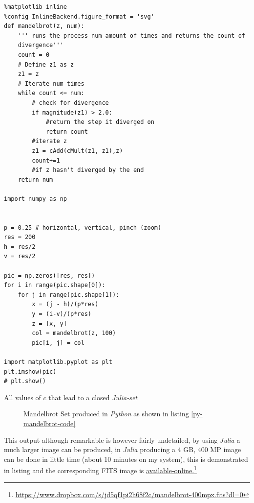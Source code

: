 \documentclass[a4paper,11pt,twoside]{article}
\begin{document}
\begin{listing}[htbp]
\begin{verbatim}
%matplotlib inline
%config InlineBackend.figure_format = 'svg'
def mandelbrot(z, num):
    ''' runs the process num amount of times and returns the count of
    divergence'''
    count = 0
    # Define z1 as z
    z1 = z
    # Iterate num times
    while count <= num:
        # check for divergence
        if magnitude(z1) > 2.0:
            #return the step it diverged on
            return count
        #iterate z
        z1 = cAdd(cMult(z1, z1),z)
        count+=1
        #if z hasn't diverged by the end
    return num

import numpy as np


p = 0.25 # horizontal, vertical, pinch (zoom)
res = 200
h = res/2
v = res/2

pic = np.zeros([res, res])
for i in range(pic.shape[0]):
    for j in range(pic.shape[1]):
        x = (j - h)/(p*res)
        y = (i-v)/(p*res)
        z = [x, y]
        col = mandelbrot(z, 100)
        pic[i, j] = col

import matplotlib.pyplot as plt
plt.imshow(pic)
# plt.show()
\end{verbatim}
\caption{\label{py-mandelbrot-code}All values of \(c\) that lead to a closed \emph{Julia-set}}
\end{listing}

\begin{figure}[htbp]
\centering

\caption{\label{mandelbrot-py-pic}Mandelbrot Set produced in \emph{Python} as shown in listing \ref{py-mandelbrot-code}}
\end{figure}

This output although remarkable is however fairly undetailed, by using \emph{Julia} a much
larger image can be produced, in \emph{Julia} producing a 4 GB, 400 MP image can be done in little time
(about 10 minutes on my system), this is demonstrated in listing 
and the corresponding FITS image is \href{https://www.dropbox.com/s/jd5qf1pi2h68f2c/mandelbrot-400mpx.fits?dl=0}{available-online.}\footnote{\href{https://www.dropbox.com/s/jd5qf1pi2h68f2c/mandelbrot-400mpx.fits?dl=0}{https://www.dropbox.com/s/jd5qf1pi2h68f2c/mandelbrot-400mpx.fits?dl=0}}
\end{document}
